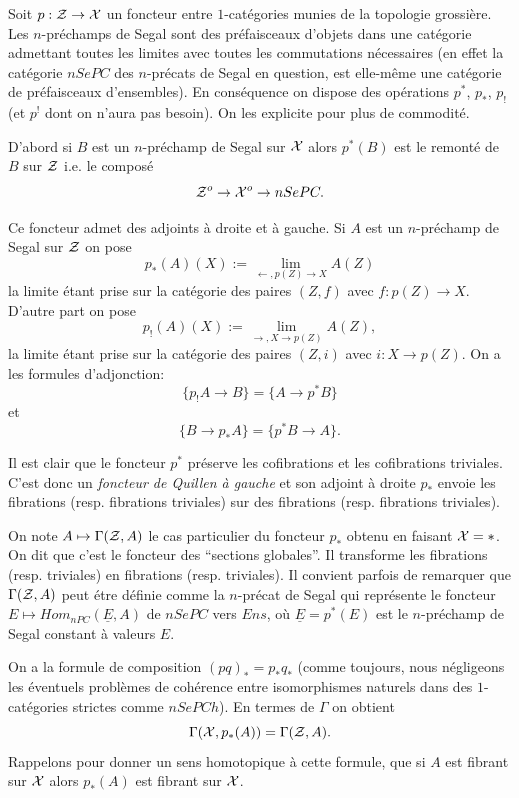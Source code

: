 \documentclass[12pt]{article}
\newcommand{\Xx}{{\cal X}}
\newcommand{\Zz}{{\cal Z}}
\begin{document}
Soit $p: \Zz \rightarrow \Xx$ un foncteur entre $1$-cat\'egories munies de
la topologie
grossi\`ere. Les $n$-pr\'echamps de Segal sont
des pr\'efaisceaux d'objets dans une cat\'egorie admettant
toutes les limites avec toutes les commutations n\'ecessaires
(en effet la cat\'egorie $nSePC$  des $n$-pr\'ecats de
Segal en question,  est elle-m\^eme une cat\'egorie de pr\'efaisceaux
d'ensembles).
En cons\'equence on dispose des op\'erations  $p^{\ast}$, $p_{\ast}$, $p_!$ (et
$p^!$ dont on n'aura pas besoin). On les explicite pour plus de
commodit\'e.

D'abord si $B$ est un $n$-pr\'echamp de Segal
sur $\Xx$ alors $p^{\ast}(B)$ est le
remont\'e de $B$ sur $\Zz$ i.e. le compos\'e
$$
\Zz ^o \rightarrow \Xx ^o \rightarrow nSePC.
$$

Ce foncteur admet des adjoints \`a droite et \`a gauche. Si $A$ est un
$n$-pr\'echamp de Segal sur $\Zz$ on pose
$$
p_{\ast}(A)(X) := \lim _{\leftarrow , p(Z)\rightarrow X}A(Z)
$$
la limite \'etant prise sur la cat\'egorie des paires $(Z, f)$ avec
$f: p(Z)\rightarrow X$. D'autre part on pose
$$
p_!(A)(X) := \lim _{\rightarrow , X\rightarrow p(Z)}A(Z),
$$
la limite \'etant prise sur la cat\'egorie des paires $(Z, i)$ avec
$i: X\rightarrow p(Z)$. On a les formules d'adjonction:
$$
\{ p_!A\rightarrow B\} = \{ A\rightarrow p^{\ast} B\}
$$
et
$$
\{ B\rightarrow p_{\ast}A\} = \{ p^{\ast}B \rightarrow A\} .
$$

Il est clair que le foncteur $p^{\ast}$ pr\'eserve les cofibrations et les
cofibrations triviales. C'est donc un {\em foncteur de Quillen \`a gauche}
et son adjoint \`a droite $p_{\ast}$ envoie les fibrations (resp. fibrations
triviales) sur des fibrations (resp. fibrations triviales).

On note  $A\mapsto \Gamma (\Zz , A)$ le cas particulier
du foncteur $p_{\ast}$ obtenu en faisant $\Xx = \ast$. On dit que
c'est le foncteur des
``sections
globales''.
Il
transforme les fibrations (resp. triviales) en fibrations (resp. triviales).
Il convient parfois de remarquer que $\Gamma (\Zz , A)$ peut \'etre d\'efinie
comme la $n$-pr\'ecat de Segal qui repr\'esente le foncteur
$E\mapsto Hom _{nPC}(\underline{E}, A)$ de $nSePC$ vers $Ens$, o\`u
$\underline{E} = p^{\ast}(E)$ est le $n$-pr\'echamp de Segal constant \`a
valeurs $E$.


On a la formule de composition $(pq)_{\ast} = p_{\ast} q_{\ast}$ (comme
toujours, nous n\'egligeons les \'eventuels probl\`emes de coh\'erence entre
isomorphismes naturels dans des $1$-cat\'egories strictes comme $nSePCh$). En
termes de $\Gamma$ on obtient
$$
\Gamma (\Xx , p_{\ast}(A))=\Gamma (\Zz , A).
$$
Rappelons pour donner un sens homotopique \`a cette formule, que si $A$ est
fibrant sur $\Xx$ alors $p_{\ast}(A)$ est fibrant sur $\Xx$.
\end{document}

